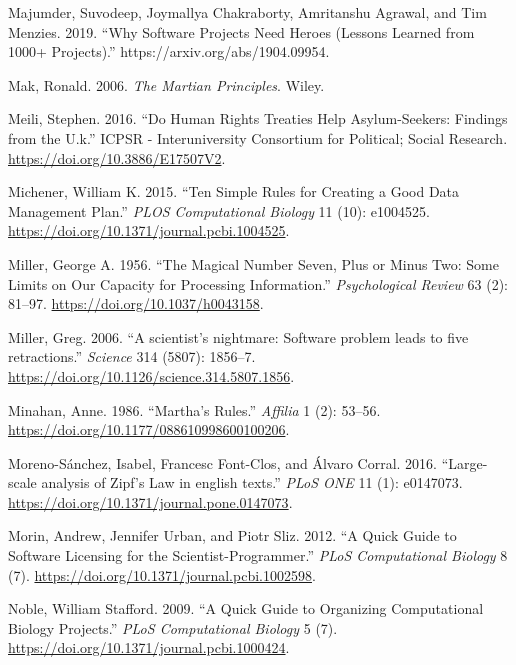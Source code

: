 \documentclass[
]{krantz}
\newlength{\cslhangindent}
\newenvironment{cslreferences}%
  {\setlength{\parindent}{0pt}%
  \everypar{\setlength{\hangindent}{\cslhangindent}}\ignorespaces}%
  {\par}
\begin{document}
\begin{cslreferences}
\leavevmode\hypertarget{ref-Maju2019}{}%
Majumder, Suvodeep, Joymallya Chakraborty, Amritanshu Agrawal, and Tim Menzies. 2019. ``Why Software Projects Need Heroes (Lessons Learned from 1000+ Projects).'' https://arxiv.org/abs/1904.09954.

\leavevmode\hypertarget{ref-Mak2006}{}%
Mak, Ronald. 2006. \emph{The Martian Principles}. Wiley.

\leavevmode\hypertarget{ref-Meil2015}{}%
Meili, Stephen. 2016. ``Do Human Rights Treaties Help Asylum-Seekers: Findings from the U.k.'' ICPSR - Interuniversity Consortium for Political; Social Research. \url{https://doi.org/10.3886/E17507V2}.

\leavevmode\hypertarget{ref-Mich2015}{}%
Michener, William K. 2015. ``Ten Simple Rules for Creating a Good Data Management Plan.'' \emph{PLOS Computational Biology} 11 (10): e1004525. \url{https://doi.org/10.1371/journal.pcbi.1004525}.

\leavevmode\hypertarget{ref-Mill1956}{}%
Miller, George A. 1956. ``The Magical Number Seven, Plus or Minus Two: Some Limits on Our Capacity for Processing Information.'' \emph{Psychological Review} 63 (2): 81--97. \url{https://doi.org/10.1037/h0043158}.

\leavevmode\hypertarget{ref-Miller2006}{}%
Miller, Greg. 2006. ``A scientist's nightmare: Software problem leads to five retractions.'' \emph{Science} 314 (5807): 1856--7. \url{https://doi.org/10.1126/science.314.5807.1856}.

\leavevmode\hypertarget{ref-Mina1986}{}%
Minahan, Anne. 1986. ``Martha's Rules.'' \emph{Affilia} 1 (2): 53--56. \url{https://doi.org/10.1177/088610998600100206}.

\leavevmode\hypertarget{ref-Moreno2016}{}%
Moreno-Sánchez, Isabel, Francesc Font-Clos, and Álvaro Corral. 2016. ``Large-scale analysis of Zipf's Law in english texts.'' \emph{PLoS ONE} 11 (1): e0147073. \url{https://doi.org/10.1371/journal.pone.0147073}.

\leavevmode\hypertarget{ref-Mori2012}{}%
Morin, Andrew, Jennifer Urban, and Piotr Sliz. 2012. ``A Quick Guide to Software Licensing for the Scientist-Programmer.'' \emph{PLoS Computational Biology} 8 (7). \url{https://doi.org/10.1371/journal.pcbi.1002598}.

\leavevmode\hypertarget{ref-Nobl2009}{}%
Noble, William Stafford. 2009. ``A Quick Guide to Organizing Computational Biology Projects.'' \emph{PLoS Computational Biology} 5 (7). \url{https://doi.org/10.1371/journal.pcbi.1000424}.


\end{cslreferences}
\end{document}
